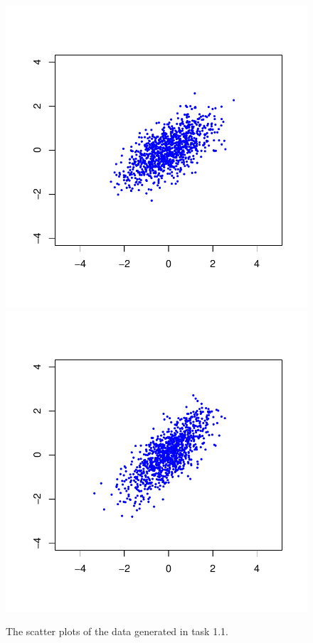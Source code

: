\documentclass{article}
\begin{document}
\begin{figure}
	\includegraphics[scale=\sscale]{scatter3}
	\includegraphics[scale=\sscale]{scatter4}
	\caption{The scatter plots of the data generated in task 1.1.}
	\label{fig:scatter}
\end{figure}
\end{document}
